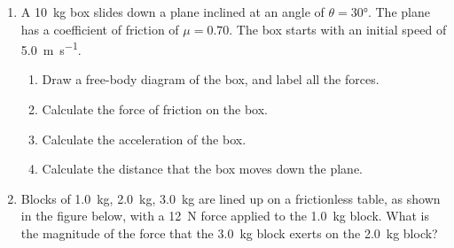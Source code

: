 \begin{enumerate}[itemsep=6pt]
\item A \SI{10}{\kilo\gram} box slides down a plane inclined at an angle of
  $\theta=\ang{30}$. The plane has a coefficient of friction of $\mu=0.70$. The
  box starts with an initial speed of \SI{5.0}{\metre\per\second}.
  \begin{enumerate}[itemsep=3pt]
  \item Draw a free-body diagram of the box, and label all the forces.
  \item Calculate the force of friction on the box.
  \item Calculate the acceleration of the box.
  \item Calculate the distance that the box moves down the plane.
  \end{enumerate}
  

\item Blocks of \SI{1.0}{\kilo\gram}, \SI{2.0}{\kilo\gram},
  \SI{3.0}{\kilo\gram} are lined up on a frictionless table, as shown in the
  figure below, with a \SI{12}{\newton} force applied to the
  \SI{1.0}{\kilo\gram} block. What is the magnitude of the force that the
  \SI{3.0}{\kilo\gram} block exerts on the \SI{2.0}{\kilo\gram} block?
  \begin{center}
  \end{center}
  

\end{enumerate}
